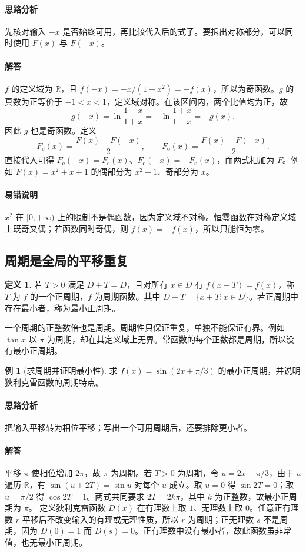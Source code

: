 \documentclass[UTF8,fontset=fandol,12pt,oneside,openany]{ctexrep}
\newcommand{\R}{\mathbb R}
\theoremstyle{definition}
\newtheorem{definition}[theorem]{定义}
\newtheorem{example}{例}[chapter]
\begin{document}
\paragraph{思路分析} 先核对输入 $-x$ 是否始终可用，再比较代入后的式子。要拆出对称部分，可以同时使用 $F(x)$ 与 $F(-x)$。
\paragraph{解答} $f$ 的定义域为 $\R$，且 $f(-x)=-x/(1+x^2)=-f(x)$，所以为奇函数。$g$ 的真数为正等价于 $-1<x<1$，定义域对称。在该区间内，两个比值均为正，故
\[
 g(-x)=\ln\frac{1-x}{1+x}=-\ln\frac{1+x}{1-x}=-g(x).
\]
因此 $g$ 也是奇函数。定义
\[
 F_{\mathrm e}(x)=\frac{F(x)+F(-x)}2,\qquad
 F_{\mathrm o}(x)=\frac{F(x)-F(-x)}2.
\]
直接代入可得 $F_{\mathrm e}(-x)=F_{\mathrm e}(x)$、$F_{\mathrm o}(-x)=-F_{\mathrm o}(x)$，而两式相加为 $F$。例如 $F(x)=x^2+x+1$ 的偶部分为 $x^2+1$、奇部分为 $x$。
\paragraph{易错说明} $x^2$ 在 $[0,+\infty)$ 上的限制不是偶函数，因为定义域不对称。恒零函数在对称定义域上既奇又偶；若函数同时奇偶，则 $f(x)=-f(x)$，所以只能恒为零。

\subsection{周期是全局的平移重复}
\begin{definition}
若 $T>0$ 满足 $D+T=D$，且对所有 $x\in D$ 有 $f(x+T)=f(x)$，称 $T$ 为 $f$ 的一个正周期，$f$ 为周期函数。其中 $D+T=\{x+T:x\in D\}$。若正周期中存在最小者，称为最小正周期。
\end{definition}
一个周期的正整数倍也是周期。周期性只保证重复，单独不能保证有界。例如 $\tan x$ 以 $\pi$ 为周期，却在其定义域上无界。常函数的每个正数都是周期，所以没有最小正周期。

\begin{example}[求周期并证明最小性]
求 $f(x)=\sin(2x+\pi/3)$ 的最小正周期，并说明狄利克雷函数的周期特点。
\end{example}
\paragraph{思路分析} 把输入平移转为相位平移；写出一个可用周期后，还要排除更小者。
\paragraph{解答} 平移 $\pi$ 使相位增加 $2\pi$，故 $\pi$ 为周期。若 $T>0$ 为周期，令 $u=2x+\pi/3$，由于 $u$ 遍历 $\R$，有 $\sin(u+2T)=\sin u$ 对每个 $u$ 成立。取 $u=0$ 得 $\sin2T=0$；取 $u=\pi/2$ 得 $\cos2T=1$。两式共同要求 $2T=2k\pi$，其中 $k$ 为正整数，故最小正周期为 $\pi$。
定义狄利克雷函数 $D(x)$ 在有理数上取 $1$、无理数上取 $0$。任意正有理数 $r$ 平移后不改变输入的有理或无理性质，所以 $r$ 为周期；正无理数 $s$ 不是周期，因为 $D(0)=1$ 而 $D(s)=0$。正有理数中没有最小者，故此函数虽非常值，也无最小正周期。
\end{document}
